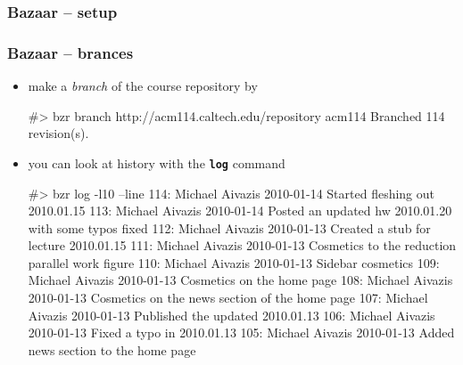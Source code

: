 %
%


\begin{frame}[fragile]
%
  \frametitle{Bazaar -- setup}
%
%
\end{frame}

\begin{frame}[fragile]
%
  \frametitle{Bazaar -- brances}
%
  \begin{itemize}
%
  \item make a {\em branch} of the course repository by
%
    \begin{shell}{}
#> bzr branch http://acm114.caltech.edu/repository acm114
Branched 114 revision(s).
    \end{shell}
%
  \item you can look at history with the {\tt\small\bfseries log} command
%
    \begin{shell}{}
#> bzr log -l10 --line
114: Michael Aivazis 2010-01-14 Started fleshing out 2010.01.15
113: Michael Aivazis 2010-01-14 Posted an updated hw 2010.01.20 with some typos fixed
112: Michael Aivazis 2010-01-13 Created a stub for lecture 2010.01.15
111: Michael Aivazis 2010-01-13 Cosmetics to the reduction parallel work figure
110: Michael Aivazis 2010-01-13 Sidebar cosmetics
109: Michael Aivazis 2010-01-13 Cosmetics on the home page
108: Michael Aivazis 2010-01-13 Cosmetics on the news section of the home page
107: Michael Aivazis 2010-01-13 Published the updated 2010.01.13
106: Michael Aivazis 2010-01-13 Fixed a typo in 2010.01.13
105: Michael Aivazis 2010-01-13 Added news section to the home page
    \end{shell}
%
  \end{itemize}
%
\end{frame}

